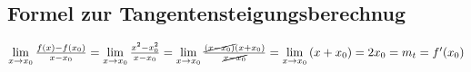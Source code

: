 \subsection{Formel zur Tangentensteigungsberechnug}
$\lim\limits_{x \rightarrow x_0}{\frac{f(x)-f(x_0)}{x-x_0}} =
\lim\limits_{x \rightarrow x_0}{\frac{x^2-x_0^2}{x-x_0}} =
\lim\limits_{x \rightarrow x_0}{\frac{\cancel{(x-x_0)}(x+x_0)}{\cancel{x-x_0}}} =
\lim\limits_{x \rightarrow x_0}{(x+x_0)} = 2x_0 = m_t = f'(x_0)$

\vspace{0.2cm}

